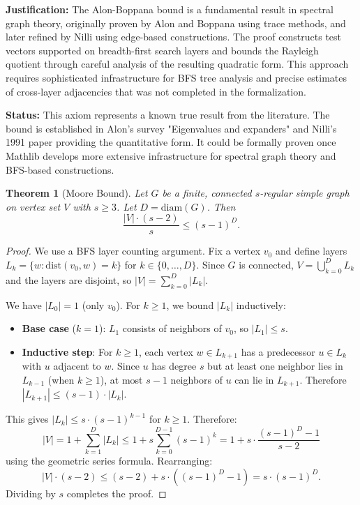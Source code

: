 \documentclass[11pt]{article}
\theoremstyle{plain}
\newtheorem*{theorem}{Theorem}
\theoremstyle{definition}
\theoremstyle{remark}
\begin{document}
\textbf{Justification:} The Alon-Boppana bound is a fundamental result in spectral graph theory, originally proven by Alon and Boppana using trace methods, and later refined by Nilli using edge-based constructions. The proof constructs test vectors supported on breadth-first search layers and bounds the Rayleigh quotient through careful analysis of the resulting quadratic form. This approach requires sophisticated infrastructure for BFS tree analysis and precise estimates of cross-layer adjacencies that was not completed in the formalization.

\textbf{Status:} This axiom represents a known true result from the literature. The bound is established in Alon's survey "Eigenvalues and expanders" and Nilli's 1991 paper providing the quantitative form. It could be formally proven once Mathlib develops more extensive infrastructure for spectral graph theory and BFS-based constructions.

\begin{theorem}[Moore Bound]
Let $G$ be a finite, connected $s$-regular simple graph on vertex set $V$ with $s \geq 3$. Let $D = \text{diam}(G)$. Then
\[
\frac{|V| \cdot (s - 2)}{s} \leq (s-1)^D.
\]
\end{theorem}

\begin{proof}
We use a BFS layer counting argument. Fix a vertex $v_0$ and define layers $L_k = \{w : \text{dist}(v_0, w) = k\}$ for $k \in \{0, \ldots, D\}$. Since $G$ is connected, $V = \bigcup_{k=0}^{D} L_k$ and the layers are disjoint, so $|V| = \sum_{k=0}^{D} |L_k|$.

We have $|L_0| = 1$ (only $v_0$). For $k \geq 1$, we bound $|L_k|$ inductively:
\begin{itemize}
\item \textbf{Base case} ($k = 1$): $L_1$ consists of neighbors of $v_0$, so $|L_1| \leq s$.
\item \textbf{Inductive step}: For $k \geq 1$, each vertex $w \in L_{k+1}$ has a predecessor $u \in L_k$ with $u$ adjacent to $w$. Since $u$ has degree $s$ but at least one neighbor lies in $L_{k-1}$ (when $k \geq 1$), at most $s-1$ neighbors of $u$ can lie in $L_{k+1}$. Therefore $|L_{k+1}| \leq (s-1) \cdot |L_k|$.
\end{itemize}

This gives $|L_k| \leq s \cdot (s-1)^{k-1}$ for $k \geq 1$. Therefore:
\[
|V| = 1 + \sum_{k=1}^{D} |L_k| \leq 1 + s \sum_{k=0}^{D-1} (s-1)^k = 1 + s \cdot \frac{(s-1)^D - 1}{s-2}
\]
using the geometric series formula. Rearranging:
\[
|V| \cdot (s-2) \leq (s-2) + s \cdot ((s-1)^D - 1) = s \cdot (s-1)^D.
\]
Dividing by $s$ completes the proof.
\end{proof}
\end{document}
